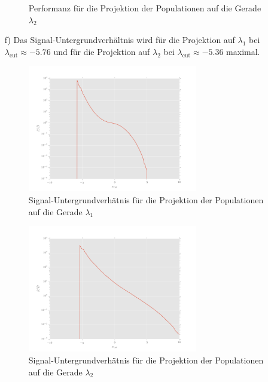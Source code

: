 \begin{itemize}
\begin{figure}[H]
	\caption{Performanz für die Projektion der Populationen auf die Gerade $\lambda_2$}
\end{figure}
\item[f)] Das Signal-Untergrundverhältnis wird für die Projektion auf $\lambda_1$ bei $\lambda_{\text{cut}}\approx -5.76$ und für die Projektion auf $\lambda_2$ bei $\lambda_{\text{cut}}\approx -5.36$ maximal.
\begin{figure}[H]
	\centering
	\includegraphics[width=0.7\textwidth]{sig_bkg_ratio.png}
	\caption{Signal-Untergrundverhätnis für die Projektion der Populationen auf die Gerade $\lambda_1$}
\end{figure}
\begin{figure}[H]
	\centering
	\includegraphics[width=0.7\textwidth]{sig_bkg_ratio2.png}
	\caption{Signal-Untergrundverhätnis für die Projektion der Populationen auf die Gerade $\lambda_2$}
\end{figure}


\end{itemize}
